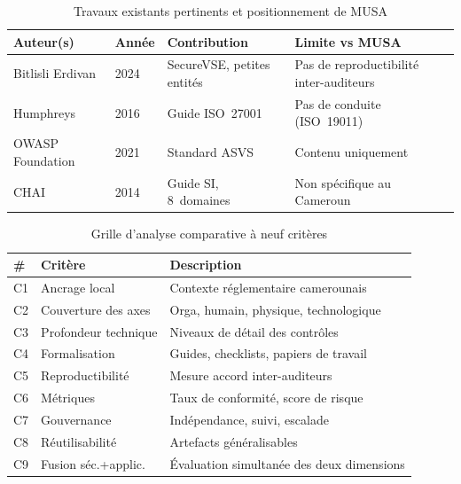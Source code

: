 \documentclass[12pt,a4paper,oneside]{report}
\begin{document}
\begin{table}[H]
\centering\small
\caption{Travaux existants pertinents et positionnement de MUSA}
\label{tab:travaux}
\begin{tabularx}{\textwidth}{p{3cm}p{1.5cm}p{4cm}X}
\toprule
\rowcolor{theadcolor}
\color{white}\textbf{Auteur(s)} &
\color{white}\textbf{Ann\'ee} &
\color{white}\textbf{Contribution} &
\color{white}\textbf{Limite vs MUSA} \\
\midrule
Bitlisli Erdivan & 2024 & SecureVSE, petites entit\'es &
  Pas de reproductibilit\'e inter-auditeurs \\
Humphreys & 2016 & Guide ISO~27001 &
  Pas de conduite (ISO~19011) \\
OWASP Foundation & 2021 & Standard ASVS &
  Contenu uniquement \\
CHAI & 2014 & Guide SI, 8~domaines &
  Non sp\'ecifique au Cameroun \\
\bottomrule
\end{tabularx}
\end{table}

\begin{table}[H]
\centering\small
\caption{Grille d'analyse comparative \`a neuf crit\`eres}
\label{tab:grille}
\begin{tabularx}{\textwidth}{p{0.8cm}p{4cm}X}
\toprule
\rowcolor{theadcolor}
\color{white}\textbf{\#} &
\color{white}\textbf{Crit\`ere} &
\color{white}\textbf{Description} \\
\midrule
C1 & Ancrage local & Contexte r\'eglementaire camerounais \\
C2 & Couverture des axes & Orga, humain, physique, technologique \\
C3 & Profondeur technique & Niveaux de d\'etail des contr\^oles \\
C4 & Formalisation & Guides, checklists, papiers de travail \\
C5 & Reproductibilit\'e & Mesure accord inter-auditeurs \\
C6 & M\'etriques & Taux de conformit\'e, score de risque \\
C7 & Gouvernance & Ind\'ependance, suivi, escalade \\
C8 & R\'eutilisabilit\'e & Artefacts g\'en\'eralisables \\
C9 & Fusion s\'ec.+applic. & \'Evaluation simultan\'ee des deux dimensions \\
\bottomrule
\end{tabularx}
\end{table}
\end{document}
